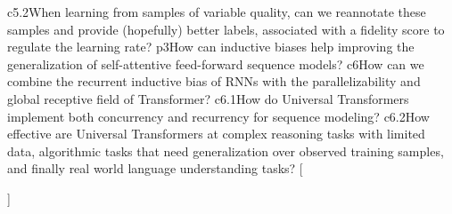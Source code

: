 {{    %
    {c5.2}{When learning from samples of variable quality, can we reannotate these samples and provide (hopefully) better labels, associated with a fidelity score to regulate the learning rate?}
    {p3}{How can inductive biases help improving the generalization of self-attentive feed-forward sequence models?}
    {c6}{How can we combine the recurrent inductive bias of RNNs with the parallelizability and global receptive field of Transformer?}%
    {c6.1}{How do Universal Transformers implement both concurrency and recurrency for sequence modeling?}
    {c6.2}{How effective are Universal Transformers at complex reasoning tasks with limited data, algorithmic tasks that need generalization over observed training samples, and finally real world language understanding tasks?}
    }[\PackageError{rq}{Undefined option to rq: #1}{}]%
}%